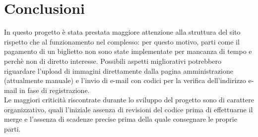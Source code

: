 \documentclass[a4paper, 12pt]{article}
\begin{document}
\section{Conclusioni}
In questo progetto è stata prestata maggiore attenzione alla struttura del sito rispetto che al funzionamento nel complesso: per questo motivo, parti come il pagamento di un biglietto non sono state implementate
per mancanza di tempo e perchè non di diretto interesse. Possibili aspetti migliorativi potrebbero riguardare l'upload di immagini direttamente dalla pagina amministrazione (attualmente manuale) e l'invio di e-mail con codici per la verifica dell'indirizzo e-mail in fase di registrazione.\\
Le maggiori criticità riscontrate durante lo sviluppo del progetto sono di carattere organizzativo, quali l'iniziale assenza di revisioni del codice prima di effettuarne il merge e l'assenza di scadenze precise prima della quale consegnare le proprie parti.
\end{document}
